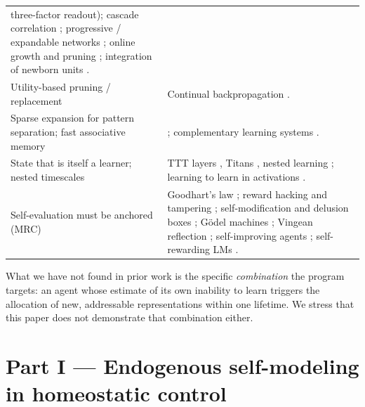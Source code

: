 \documentclass[11pt]{article}
\theoremstyle{remark}
\begin{document}
\begin{table}[t]
\begin{tabularx}{\linewidth}{>{\raggedright\arraybackslash}p{4.6cm}X}
three-factor readout); cascade correlation \citep{fahlman1990cascade}; progressive / expandable networks
\citep{rusu2016progressive,yoon2018lifelong}; online growth and pruning \citep{jia2025smgrnn}; integration of newborn
units \citep{lillo2026stability}. \\
Utility-based pruning / replacement &
Continual backpropagation \citep{dohare2024loss}. \\
Sparse expansion for pattern separation; fast associative memory &
\citet{babadi2014sparseness,dasgupta2017neural,kanerva1988sparse}; complementary learning systems
\citep{mcclelland1995why,kumaran2016what}. \\
State that is itself a learner; nested timescales &
TTT layers \citep{sun2024learning,akyurek2025surprising}, Titans \citep{behrouz2025titans}, nested learning
\citep{behrouz2025nested}; learning to learn in activations \citep{duan2016rl2,wang2016learning}. \\
Self-evaluation must be anchored (MRC) &
Goodhart's law \citep{goodhart1975problems,manheim2018categorizing}; reward hacking and tampering
\citep{amodei2016concrete,skalse2022defining,everitt2021reward}; self-modification and delusion boxes
\citep{orseau2011self,ring2011delusion}; G\"odel machines \citep{schmidhuber2003godel}; Vingean reflection
\citep{fallenstein2015vingean}; self-improving agents \citep{zhang2025darwin,yin2024godel}; self-rewarding LMs
\citep{yuan2024self}. \\
\bottomrule
\end{tabularx}
\end{table}

What we have not found in prior work is the specific \emph{combination} the program targets: an agent whose
estimate of its own inability to learn triggers the allocation of new, addressable representations within one
lifetime. We stress that this paper does not demonstrate that combination either.

\section{Part I --- Endogenous self-modeling in homeostatic control}
\label{sec:part1}
\end{document}
